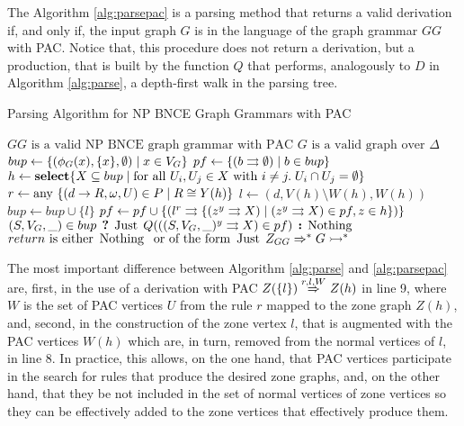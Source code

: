 The Algorithm \ref{alg:parsepac} is a parsing method that returns a valid derivation if, and only if, the input graph $G$ is in the language of the graph grammar $GG$ with PAC. Notice that, this procedure does not return a derivation, but a production, that is built by the function $Q$ that performs, analogously to $D$ in Algorithm \ref{alg:parse}, a depth-first walk in the parsing tree.

\begin{algorithm}[!h]
	\caption{Parsing Algorithm for NP BNCE Graph Grammars with PAC}
	\begin{algorithmic}[1]
		\Require $GG \text{ is a valid NP BNCE graph grammar with PAC}$
		\Require $G \text{ is a valid graph over } \Delta$
		\State $bup \gets \{(\phi_G(x),\{x\},\emptyset) \; | \; x \in V_G\}$
		\State $pf \gets \{ \ptree{b}{}{\emptyset} \st b \in bup \}$
		\Repeat
		\State $h \gets \text{\textbf{select}} \{X \subseteq bup \; | \;\text{for all } U_i, U_j \in X \text{ with } i \neq j . \; U_i \cap U_j = \emptyset \}$
		\State $r \gets \text{any } \{(d \to R,\omega,U) \in P \; | \; R \cong Y(h) \}$
		\State $l \gets (d,V(h)\setminus W(h), W(h))$ 
		 
		\State $bup \gets bup \cup \{l\}$
		\State $pf \gets pf \cup \{ \ptree{l}{r}{\{\ptree{z}{y}{X} \st \ptree{z}{y}{X} \in pf, z \in h \}} \}$
		\EndIf
		\EndFor
		 
		\State \Return $(S, V_G, \_) \in bup \? \Just Q(\ptree{(S,V_G, \_)}{y}{X} \in pf) \: \Nothing $
		\EndFunction
		\Ensure $return \text{ is either } \operatorname{\text{Nothing}}\; \text{ or of the form } \operatorname{\text{Just}}\; Z_{GG} \Rightarrow^*_{} G \rightarrowtail^*$
	\end{algorithmic}
	\label{alg:parsepac}
\end{algorithm}

The most important difference between Algorithm \ref{alg:parse} and \ref{alg:parsepac} are, first, in the use of a derivation with PAC $Z(\{l\}) \derivpac{r}{l}{W}{} Z(h)$ in line 9, where $W$ is the set of PAC vertices $U$ from the rule $r$ mapped to the zone graph $Z(h)$, and, second, in the construction of the zone vertex $l$, that is augmented with the PAC vertices $W(h)$ which are, in turn, removed from the normal vertices of $l$, in line 8. In practice, this allows, on the one hand, that PAC vertices participate in the search for rules that produce the desired zone graphs, and, on the other hand, that they be not included in the set of normal vertices of zone vertices so they can be effectively added to the zone vertices that effectively produce them.

